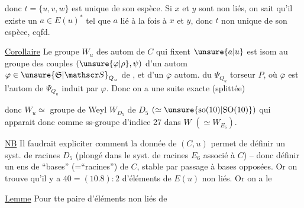 donc $t=\{u,v,w\}$ est unique de son espèce. Si $x$ et $y$ sont non liés, on sait qu'il existe un  $a\in E(u)^*$ tel que $a$ lié à la fois à $x$ et $y$, donc $t$ non unique de son espèce, cqfd.

\uline{Corollaire} Le groupe  $W_u$  des autom de $C$ qui fixent $\unsure{a|u}$ est  isom au groupe des couples $(\unsure{\varphi|\rho},\psi)$ d'un autom $\varphi\in\unsure{\mathfrak S|\mathscr S}_{Q_u}$ de , et d'un $\overline{\varphi}$ autom. du  $\Psi_{Q_u}$ torseur $P$, où $\overline{\varphi}$ est l'autom de $\Psi_{Q_u}$ induit par $\varphi$. Donc on a une suite exacte (splittée)


donc $W_u\simeq$ groupe de Weyl $W_{D_5}$ de $D_5$ $(\simeq\unsure{\mathrm{so}(10)|\mathrm{SO}(10)})$ qui apparait donc comme ss-groupe d'indice 27 dans $W$ $(\simeq W_{E_6})$.

\uline{NB} Il faudrait expliciter comment la donnée de $(C,u)$ permet de définir un syst. de racines $D_5$ (plongé dans le syst. de racines $E_6$ associé à $C$) -- donc définir un ens de  ``bases'' (=``racines'') de $C$, stable par passage à bases opposées. Or on trouve qu'il y a $40=(10.8):2$    d'éléments de $E(u)$ non liés. Or on a le

\uline{Lemme} Pour tte paire  d'éléments non liés de
